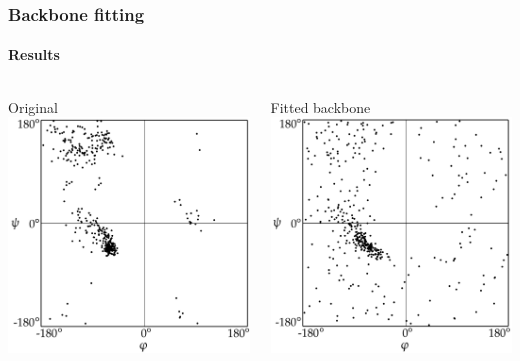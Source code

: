 \documentclass{beamer}
\begin{document}
\begin{frame}[t, fragile]
\frametitle{Backbone fitting} 
\framesubtitle{Results}
\begin{columns}[c]
\column{1.7in}
\centering
Original\\
\hspace*{-.33cm}\includegraphics[width=1\columnwidth]{plot_ramachandran_orig}

\column{1.7in}
\centering
Fitted backbone\\
\hspace*{-.4cm}\includegraphics[width=1\columnwidth]{plot_ramachandran}
\end{columns}
\end{frame}


\end{document}
